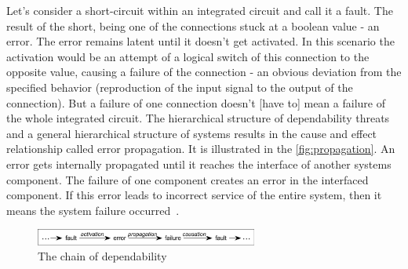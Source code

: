Let's consider a short-circuit within an integrated circuit and call it a fault. The result of the short, being one of the connections stuck at a boolean value - an error. The error remains latent until it doesn't get activated. In this scenario the activation would be an attempt of a logical switch of this connection to the opposite value, causing a failure of the connection - an obvious deviation from the specified behavior (reproduction of the input signal to the output of the connection). But a failure of one connection doesn't [have to] mean a failure of the whole integrated circuit. The hierarchical structure of dependability threats and a general hierarchical structure of systems results in the cause and effect relationship called error propagation. It is illustrated in the \autoref{fig:propagation}. An error gets internally propagated until it reaches the interface of another systems component. The failure of one component creates an error in the interfaced component. If this error leads to incorrect service of the entire system, then it means the system failure occurred~\cite{art:Avizienis, art:Avizienis2}. \\

\begin{figure}[H]
\centering
\includegraphics[width=0.65\textwidth]{figures/propagation.png}
\caption{The chain of dependability~\cite{art:Avizienis}}
\label{fig:propagation}
\end{figure}

